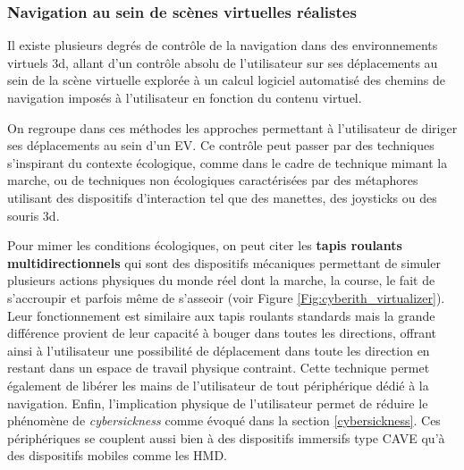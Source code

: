 \subsubsection{Navigation au sein de scènes virtuelles réalistes}

Il existe plusieurs degrés de contrôle de la navigation dans des environnements virtuels 3d, allant d'un contrôle absolu de l'utilisateur sur ses déplacements au sein de la scène virtuelle explorée à un calcul logiciel automatisé des chemins de navigation imposés à l'utilisateur en fonction du contenu virtuel.


On regroupe dans ces méthodes les approches permettant à l'utilisateur de diriger ses déplacements au sein d'un EV. Ce contrôle peut passer par des techniques s'inspirant du contexte écologique, comme dans le cadre de technique mimant la marche, ou de techniques non écologiques caractérisées par des métaphores utilisant des dispositifs d'interaction tel que des manettes, des joysticks ou des souris 3d.

Pour mimer les conditions écologiques, on peut citer les \textbf{tapis roulants multidirectionnels} qui sont des dispositifs mécaniques permettant de simuler plusieurs actions physiques du monde réel dont la marche, la course, le fait de s'accroupir et parfois même de s'asseoir (voir Figure \ref{Fig:cyberith_virtualizer}). Leur fonctionnement est similaire aux tapis roulants standards mais la grande différence provient de leur capacité à bouger dans toutes les directions, offrant ainsi à l'utilisateur une possibilité de déplacement dans toute les direction en restant dans un espace de travail physique contraint. Cette technique permet également de libérer les mains de l'utilisateur de tout périphérique dédié à la navigation. Enfin, l'implication physique de l'utilisateur permet de réduire le phénomène de \textit{cybersickness} comme évoqué dans la section \ref{cybersickness}.
Ces périphériques se couplent aussi bien à des dispositifs immersifs type CAVE qu'à des dispositifs mobiles comme les HMD.


